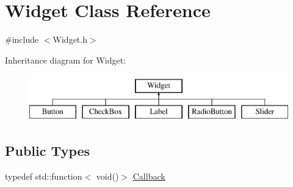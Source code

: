 \hypertarget{class_widget}{}\section{Widget Class Reference}
\label{class_widget}


{\ttfamily \#include $<$Widget.\+h$>$}

Inheritance diagram for Widget\+:\begin{figure}[H]
\begin{center}
\leavevmode
\includegraphics[height=2.000000cm]{class_widget}
\end{center}
\end{figure}
\subsection*{Public Types}
\begin{DoxyCompactItemize}
\item 
typedef std\+::function$<$ void()$>$ \mbox{\hyperlink{class_widget_af75970041184b1a72bceff618e142a09}{Callback}}
\end{DoxyCompactItemize}

